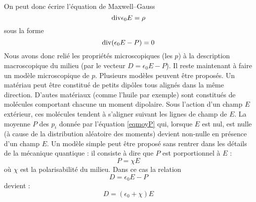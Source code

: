 \documentclass[12pt]{book}
\begin{document}
\begin{exmp}
On peut donc \'ecrire l'\'equation de Maxwell--Gauss 
\begin{equation}
{\rm div} \epsilon_0E=\rho
\end{equation}
sous la forme
\begin{equation}
{\rm div} (\epsilon_0E-P)=0
\end{equation}
Nous avons donc reli\'e les propri\'et\'es microscopiques (les $p$) \`a
la description macroscopique du milieu (par le vecteur
$D=\epsilon_0E-P$). Il reste 
maintenant \`a faire un mod\`ele microscopique de $p$.
Plusieurs mod\`eles peuvent \^etre propos\'es. Un mat\'eriau peut
\^etre constitu\'e de petits dip\^oles tous align\'es dans la m\^eme
direction. D'autes mat\'eriaux (comme l'huile par exemple) sont
constitu\'es de mol\'ecules comportant chacune un moment dipolaire.
Sous l'action d'un champ $E$ ext\'erieur, ces mol\'ecules tendent \`a
s'aligner suivant les lignes de champ de $E$. La moyenne $P$ des $p_i$
donn\'ee par l'\'equation \ref{eqmoyP} qui, lorsque $E$ est nul, est
nulle (\`a cause de la distribution al\'eatoire des moments) devient
non-nulle en pr\'esence d'un champ $E$. Un mod\`ele simple peut \^etre
propos\'e sans rentrer dans les d\'etails de la m\'ecanique quantique
: il consiste \`a dire que $P$ est porportionnel \`a $E$ :
\begin{equation}
P=\chi  E
\end{equation}
o\`u $\chi$ est la polarisabilit\'e du milieu. 
Dans ce cas la relation
\begin{equation}
D=\epsilon_0E-P
\end{equation}
devient :
\begin{equation}
D=(\epsilon_0+\chi )E
\end{equation}
\end{exmp}
\end{document}
